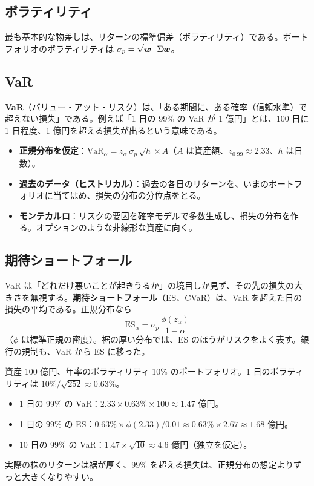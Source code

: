 \subsection{ボラティリティ}

最も基本的な物差しは、リターンの標準偏差（ボラティリティ）である。ポートフォリオのボラティリティは $\sigma_p = \sqrt{\bm w^{\top}\Sigma\bm w}$。

\subsection{VaR}

\textbf{VaR}（バリュー・アット・リスク）は、「ある期間に、ある確率（信頼水準）で超えない損失」である。例えば「1 日の 99\% の VaR が 1 億円」とは、100 日に 1 日程度、1 億円を超える損失が出るという意味である。

\begin{itemize}
\item \textbf{正規分布を仮定}：$\mathrm{VaR}_\alpha = z_\alpha\,\sigma_p\,\sqrt{h} \times A$（$A$ は資産額、$z_{0.99} \approx 2.33$、$h$ は日数）。
\item \textbf{過去のデータ（ヒストリカル）}：過去の各日のリターンを、いまのポートフォリオに当てはめ、損失の分布の分位点をとる。
\item \textbf{モンテカルロ}：リスクの要因を確率モデルで多数生成し、損失の分布を作る。オプションのような非線形な資産に向く。
\end{itemize}

\subsection{期待ショートフォール}

VaR は「どれだけ悪いことが起きうるか」の境目しか見ず、その先の損失の大きさを無視する。\textbf{期待ショートフォール}（ES、CVaR）は、VaR を超えた日の損失の平均である。正規分布なら
\begin{equation}
\mathrm{ES}_\alpha = \sigma_p\,\frac{\phi(z_\alpha)}{1-\alpha}
\end{equation}
（$\phi$ は標準正規の密度）。裾の厚い分布では、ES のほうがリスクをよく表す。銀行の規制も、VaR から ES に移った。

\begin{exbox}
資産 100 億円、年率のボラティリティ 10\% のポートフォリオ。1 日のボラティリティは $10\% / \sqrt{252} \approx 0.63\%$。
\begin{itemize}
\item 1 日の 99\% の VaR：$2.33 \times 0.63\% \times 100 \approx 1.47$ 億円。
\item 1 日の 99\% の ES：$0.63\% \times \phi(2.33)/0.01 \approx 0.63\% \times 2.67 \approx 1.68$ 億円。
\item 10 日の 99\% の VaR：$1.47 \times \sqrt{10} \approx 4.6$ 億円（独立を仮定）。
\end{itemize}
実際の株のリターンは裾が厚く、99\% を超える損失は、正規分布の想定よりずっと大きくなりやすい。
\end{exbox}

